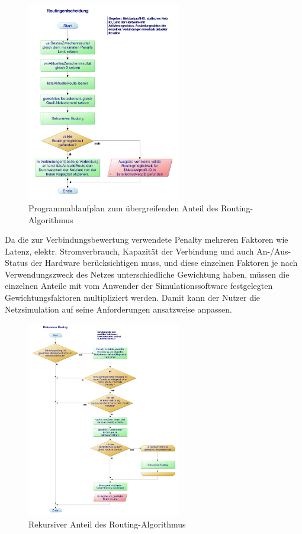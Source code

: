 \documentclass[12pt,titlepage]{article}
\begin{document}
\begin{figure}[!h]
	\centering
	\includegraphics[width=0.6\textwidth]{2Routingentscheidung}
	\caption{Programmablaufplan zum übergreifenden Anteil des Routing-Algorithmus}
	\label{fig:2Routingentscheidung}
\end{figure}

Da die zur Verbindungsbewertung verwendete Penalty mehreren Faktoren wie Latenz, elektr. Stromverbrauch, Kapazität der Verbindung und auch An-/Aus-Status der Hardware berücksichtigen muss, und diese einzelnen Faktoren je nach Verwendungszweck des Netzes unterschiedliche Gewichtung haben, müssen die einzelnen Anteile mit vom Anwender der Simulationssoftware festgelegten Gewichtungsfaktoren multipliziert werden. Damit kann der Nutzer die Netzsimulation auf seine Anforderungen ansatzweise anpassen.
\begin{figure}[!h]
	\centering
	\includegraphics[width=0.6\textwidth]{3Rekursives_Routing}
	\caption{Rekursiver Anteil des Routing-Algorithmus}
	\label{fig:3Rekursives_Routing}
\end{figure}
\end{document}
